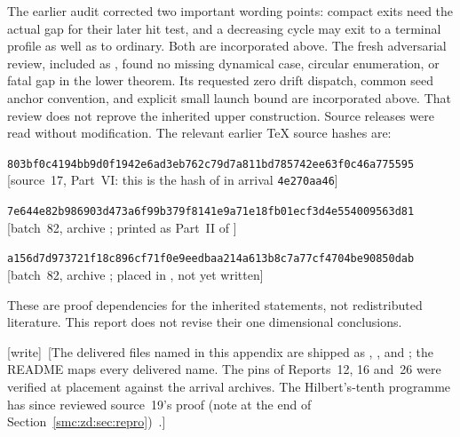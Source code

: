 \documentclass[11pt,letterpaper]{article}
\numberwithin{equation}{section}
\theoremstyle{definition}
\theoremstyle{remark}
\newcommand{\wtag}{\textup{[write]}}
\newcommand{\file}[1]{\texttt{\detokenize{#1}}}
\begin{document}
The earlier audit corrected two important wording points: compact exits need the actual gap for their later hit test, and a decreasing cycle may exit to a terminal profile as well as to ordinary. Both are incorporated above. The fresh adversarial review, included as \file{scientific/independent-review.md}, found no missing dynamical case, circular enumeration, or fatal gap in the lower theorem. Its requested zero drift dispatch, common seed anchor convention, and explicit small launch bound are incorporated above. That review does not reprove the inherited upper construction. Source releases were read without modification. The relevant earlier TeX source hashes are:
\begin{description}[style=nextline,leftmargin=0pt,labelsep=0pt]
\item[Report 12 four mass decision precursor]
\small\texttt{803bf0c4194bb9d0f1942e6ad3eb762c79d7a811bd785742ee63f0c46a775595}\\
\textup{[source~17, Part~VI: this is the hash of  in arrival \texttt{4e270aa46}]}
\item[Report 16 literal reversible source]
\small\texttt{7e644e82b986903d473a6f99b379f8141e9a71e18fb01ecf3d4e554009563d81}\\
\textup{[batch~82, archive ; printed as Part~II of ]}
\item[Report 26 parallel involution replacement]
\small\texttt{a156d7d973721f18c896cf71f0e9eedbaa214a613b8c7a77cf4704be90850dab}\\
\textup{[batch~82, archive ; placed in , not yet written]}
\end{description}
These are proof dependencies for the inherited statements, not redistributed literature. This report does not revise their one dimensional conclusions.

\wtag\ [The delivered files named in this appendix are shipped as , ,  and ; the README maps every delivered name. The pins of Reports~12, 16 and~26 were verified at placement against the arrival archives. The Hilbert's-tenth programme has since reviewed source~19's proof (note at the end of Section~\ref{smc:zd:sec:repro})~\cite{reviewzd}.]
\end{document}
